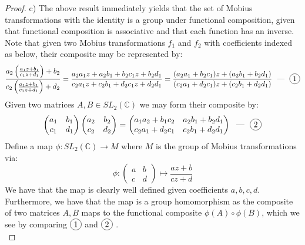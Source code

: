 \documentclass{article}
\newcommand*\circled[1]{\tikz[baseline=(char.base)]{
            \node[shape=circle,draw,inner sep=2pt] (char) {#1};}}
\newcommand{\bb}[1]{\mathbb{#1}}
\begin{document}
\begin{proof}
  c) The above result immediately yields that the set of Mobius transformations with the identity is a group under functional composition, given that functional composition is associative and that each function has an inverse. Note that given two Mobius transformations $f_{1}$ and $f_{2}$ with coefficients indexed as below, their composite may be represented by:
  \[
    \frac{a_{2}\left(\frac{a_{1}z+b_{1}}{c_{1}z+d_{1}}\right) + b_{2}}{c_{2}\left(\frac{a_{1}z+b_{1}}{c_{1}z+d_{1}}\right) + d_{2}} = \frac{a_{2}a_{1}z + a_{2}b_{1} + b_{2}c_{1}z + b_{2}d_{1}}{c_{2}a_{1}z +c_{2}b_{1} + d_{2}c_{1}z + d_{2}d_{1}} = \frac{(a_{2}a_{1} +b_{2}c_{1})z + (a_{2}b_{1} + b_{2}d_{1})}{(c_{2}a_{1} +d_{2}c_{1})z + (c_{2}b_{1}+d_{2}d_{1})} \text{ \ --- \ }  \circled{1}
  \]
  Given two matrices $A, B \in SL_{2}(\bb{C})$ we may form their composite by:
  \[
    \begin{pmatrix}
      a_{1} & b_{1} \\
      c_{1} & d_{1}
    \end{pmatrix}
        \begin{pmatrix}
      a_{2} & b_{2} \\
      c_{2} & d_{2}
    \end{pmatrix}
    =
        \begin{pmatrix}
      a_{1}a_{2} + b_{1}c_{2} & a_{2}b_{1} + b_{2}d_{1} \\
      c_{2}a_{1} +d_{2}c_{1} & c_{2}b_{1} + d_{2}d_{1}
    \end{pmatrix}
    \text{ \ --- \ }  \circled{2}
  \]
  Define a map $\phi: SL_{2}(\bb{C}) \to M$ where $M$ is the group of Mobius transformations via:
  \[
    \phi :    \begin{pmatrix}
      a & b \\
      c & d
    \end{pmatrix}
    \mapsto \frac{az + b}{cz + d}
  \]
  We have that the map is clearly well defined given coefficients $a,b,c,d$. Furthermore, we have that the map is a group homomorphism as the composite of two matrices $A, B$ maps to the functional composite $\phi(A) \circ \phi(B)$, which we see by comparing $\circled{1}$ and $\circled{2}$ . \\


\end{proof}
\end{document}
